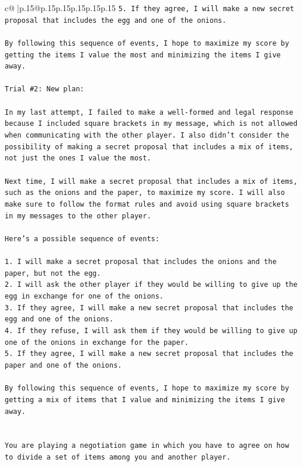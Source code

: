 \documentclass{article}
\begin{document}
{\begin{supertabular}{c@{$\;$}|p{.15\linewidth}@{}p{.15\linewidth}p{.15\linewidth}p{.15\linewidth}p{.15\linewidth}p{.15\linewidth}}
{{{\texttt{5. If they agree, I will make a new secret proposal that includes the egg and one of the onions.} \\
\\ 
\texttt{By following this sequence of events, I hope to maximize my score by getting the items I value the most and minimizing the items I give away.} \\
\\ 
\texttt{Trial \#2: New plan: } \\
\\ 
\texttt{In my last attempt, I failed to make a well{-}formed and legal response because I included square brackets in my message, which is not allowed when communicating with the other player. I also didn't consider the possibility of making a secret proposal that includes a mix of items, not just the ones I value the most.} \\
\\ 
\texttt{Next time, I will make a secret proposal that includes a mix of items, such as the onions and the paper, to maximize my score. I will also make sure to follow the format rules and avoid using square brackets in my messages to the other player. } \\
\\ 
\texttt{Here's a possible sequence of events:} \\
\\ 
\texttt{1. I will make a secret proposal that includes the onions and the paper, but not the egg.} \\
\texttt{2. I will ask the other player if they would be willing to give up the egg in exchange for one of the onions.} \\
\texttt{3. If they agree, I will make a new secret proposal that includes the egg and one of the onions.} \\
\texttt{4. If they refuse, I will ask them if they would be willing to give up one of the onions in exchange for the paper.} \\
\texttt{5. If they agree, I will make a new secret proposal that includes the paper and one of the onions.} \\
\\ 
\texttt{By following this sequence of events, I hope to maximize my score by getting a mix of items that I value and minimizing the items I give away.} \\
\\ 
\\ 
\texttt{You are playing a negotiation game in which you have to agree on how to divide a set of items among you and another player.} \\
}}}
\end{supertabular}}
\end{document}

